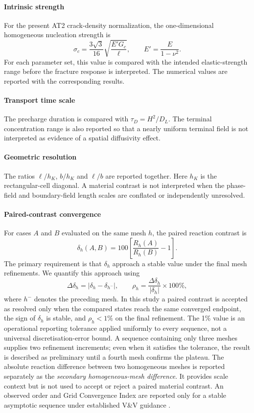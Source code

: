 \documentclass[preprint,12pt]{elsarticle}
\begin{document}
\paragraph{Intrinsic strength}
For the present AT2 crack-density normalization, the one-dimensional homogeneous
nucleation strength is \cite{tanne2018,wu2018}
\[
\sigma_c=\frac{3\sqrt{3}}{16}\sqrt{\frac{E'G_c}{\ell}},
\qquad E'=\frac{E}{1-\nu^2}.
\]
For each parameter set, this value is compared with the intended elastic-strength
range before the fracture response is interpreted. The numerical values are
reported with the corresponding results.

\paragraph{Transport time scale}
The precharge duration is compared with
\(\tau_D=H^2/D_L\). The terminal concentration range is also reported so that a
nearly uniform terminal field is not interpreted as evidence of a spatial
diffusivity effect.

\paragraph{Geometric resolution}
The ratios \(\ell/h_K\), \(b/h_K\) and \(\ell/b\) are reported together. Here
\(h_K\) is the rectangular-cell diagonal. A material contrast is not interpreted
when the phase-field and boundary-field length scales are conflated or
independently unresolved.

\paragraph{Paired-contrast convergence}
For cases \(A\) and \(B\) evaluated on the same mesh \(h\), the paired reaction
contrast is
\[
\delta_h(A,B)=100\left[\frac{R_h(A)}{R_h(B)}-1\right].
\]
The primary requirement is that $\delta_h$ approach a stable value under the final mesh refinements. We quantify this approach using
\begin{equation}
  \Delta\delta_h=\left|\delta_h-\delta_{h^-}\right|,
  \qquad
  \rho_h=\frac{\Delta\delta_h}{|\delta_h|}\times 100\%,
  \label{eq:paired_plateau}
\end{equation}
where $h^-$ denotes the preceding mesh. In this study a paired contrast is accepted as resolved only when the compared states reach the same converged endpoint, the sign of $\delta_h$ is stable, and $\rho_h<1\%$ on the final refinement. The 1\% value is an operational reporting tolerance applied uniformly to every sequence, not a universal discretisation-error bound. A sequence containing only three meshes supplies two refinement increments; even when it satisfies the tolerance, the result is described as preliminary until a fourth mesh confirms the plateau. The absolute reaction difference between two homogeneous meshes is reported separately as the \emph{secondary homogeneous-mesh difference}. It provides scale context but is not used to accept or reject a paired material contrast. An observed order and Grid Convergence
Index are reported only for a stable asymptotic sequence under established V\&V
guidance \cite{celik2008,asmevv102019}.
\end{document}
